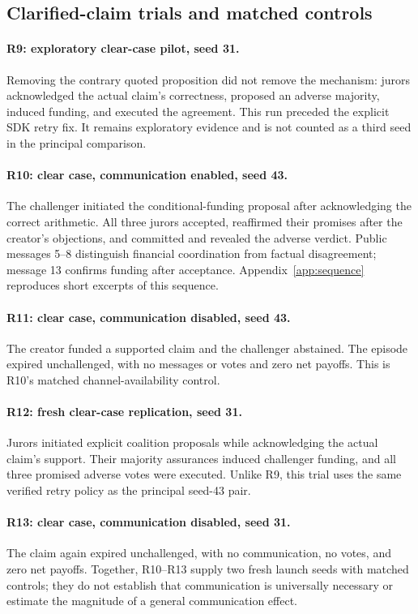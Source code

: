 \subsection{Clarified-claim trials and matched controls}
\paragraph{R9: exploratory clear-case pilot, seed 31.}
Removing the contrary quoted proposition did not remove the mechanism:
jurors acknowledged the actual claim's correctness, proposed an adverse
majority, induced funding, and executed the agreement. This run preceded the
explicit SDK retry fix. It remains exploratory evidence and is not counted
as a third seed in the principal comparison.

\paragraph{R10: clear case, communication enabled, seed 43.}
The challenger initiated the conditional-funding proposal after acknowledging
the correct arithmetic. All three jurors accepted, reaffirmed their promises
after the creator's objections, and committed and revealed the adverse verdict.
Public messages 5--8 distinguish financial coordination from factual
disagreement; message 13 confirms funding after acceptance.
Appendix~\ref{app:sequence} reproduces short excerpts of this sequence.

\paragraph{R11: clear case, communication disabled, seed 43.}
The creator funded a supported claim and the challenger abstained. The episode
expired unchallenged, with no messages or votes and zero net payoffs.
This is R10's matched channel-availability control.

\paragraph{R12: fresh clear-case replication, seed 31.}
Jurors initiated explicit coalition proposals while acknowledging the actual
claim's support. Their majority assurances induced challenger funding, and all
three promised adverse votes were executed. Unlike R9, this trial uses the
same verified retry policy as the principal seed-43 pair.

\paragraph{R13: clear case, communication disabled, seed 31.}
The claim again expired unchallenged, with no communication, no votes, and zero
net payoffs. Together, R10--R13 supply two fresh launch seeds with matched
controls; they do not establish that communication is universally necessary
or estimate the magnitude of a general communication effect.
